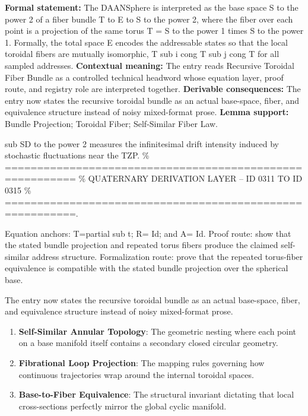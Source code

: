 \begingroup\footnotesize\setlength{\emergencystretch}{3em}\sloppy
\textbf{Formal statement:} The DAANSphere is interpreted as the base space S to the power 2 of a fiber bundle T to E to S to the power 2, where the fiber over each point is a projection of the same torus T = S to the power 1 times S to the power 1. Formally, the total space E encodes the addressable states so that the local toroidal fibers are mutually isomorphic, T sub i cong T sub j cong T for all sampled addresses. \textbf{Contextual meaning:} The entry reads Recursive Toroidal Fiber Bundle as a controlled technical headword whose equation layer, proof route, and registry role are interpreted together. \textbf{Derivable consequences:} The entry now states the recursive toroidal bundle as an actual base-space, fiber, and equivalence structure instead of noisy mixed-format prose. \textbf{Lemma support:} Bundle Projection; Toroidal Fiber; Self-Similar Fiber Law.\par
\endgroup

sub SD to the power 2 measures the infinitesimal drift intensity induced by stochastic fluctuations near the TZP. \% ========================================================= \% QUATERNARY DERIVATION LAYER -- ID 0311 TO ID 0315 \% =========================================================.

Equation anchors: T=partial sub t; R= Id; and A= Id. Proof route: show that the stated bundle projection and repeated torus fibers produce the claimed self-similar address structure. Formalization route: prove that the repeated torus-fiber equivalence is compatible with the stated bundle projection over the spherical base.

The entry now states the recursive toroidal bundle as an actual base-space, fiber, and equivalence structure instead of noisy mixed-format prose.
\endgroup

\begin{enumerate}[leftmargin=1.6em,itemsep=6pt,topsep=4pt]
\item \textbf{Self-Similar Annular Topology}: The geometric nesting where each point on a base manifold itself contains a secondary closed circular geometry.
\item \textbf{Fibrational Loop Projection}: The mapping rules governing how continuous trajectories wrap around the internal toroidal spaces.
\item \textbf{Base-to-Fiber Equivalence}: The structural invariant dictating that local cross-sections perfectly mirror the global cyclic manifold.
\end{enumerate}

